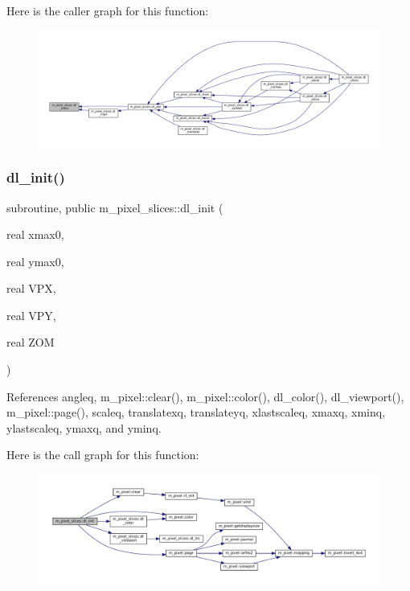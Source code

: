 Here is the caller graph for this function\+:\nopagebreak
\begin{figure}[H]
\begin{center}
\leavevmode
\includegraphics[width=350pt]{namespacem__pixel__slices_aa0de53a25754eab8fff1732aa2f93eba_icgraph}
\end{center}
\end{figure}
\mbox{\label{namespacem__pixel__slices_a4ac8bc6e1f869e60a675611420fee0f7}} 
\subsubsection{\texorpdfstring{dl\+\_\+init()}{dl\_init()}}
{\footnotesize\ttfamily subroutine, public m\+\_\+pixel\+\_\+slices\+::dl\+\_\+init (\begin{DoxyParamCaption}\item[{real}]{xmax0,  }\item[{real}]{ymax0,  }\item[{real}]{V\+PX,  }\item[{real}]{V\+PY,  }\item[{real}]{Z\+OM }\end{DoxyParamCaption})}



References angleq, m\+\_\+pixel\+::clear(), m\+\_\+pixel\+::color(), dl\+\_\+color(), dl\+\_\+viewport(), m\+\_\+pixel\+::page(), scaleq, translatexq, translateyq, xlastscaleq, xmaxq, xminq, ylastscaleq, ymaxq, and yminq.

Here is the call graph for this function\+:\nopagebreak
\begin{figure}[H]
\begin{center}
\leavevmode
\includegraphics[width=350pt]{namespacem__pixel__slices_a4ac8bc6e1f869e60a675611420fee0f7_cgraph}
\end{center}
\end{figure}
\mbox{\label{namespacem__pixel__slices_a1508683ec3b2444091bb34d40b5d8b93}} 
